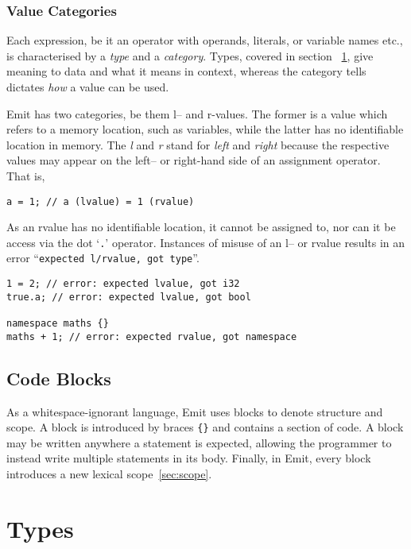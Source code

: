 \documentclass{article}
\begin{document}
    \subsubsection{Value Categories}

    Each expression, be it an operator with operands, literals, or variable names etc., is characterised by a \textit{type} and a \textit{category}.
    Types, covered in section ~\ref{sec:types}, give meaning to data and what it means in context, whereas the category tells dictates \textit{how} a value can be used.

    Emit has two categories, be them l-- and r-values.
    The former is a value which refers to a memory location, such as variables, while the latter has no identifiable location in memory.
    The \textit{l} and \textit{r} stand for \textit{left} and \textit{right} because the respective values may appear on the left-- or right-hand side of an assignment operator.
    That is,

    \begin{lstlisting}[language=CustomLang]
a = 1; // a (lvalue) = 1 (rvalue)
    \end{lstlisting}

    As an rvalue has no identifiable location, it cannot be assigned to, nor can it be access via the dot `\texttt{.}' operator.
    Instances of misuse of an l-- or rvalue results in an error ``\texttt{expected l/rvalue, got type}''.

    \begin{lstlisting}[language=CustomLang]
1 = 2; // error: expected lvalue, got i32
true.a; // error: expected lvalue, got bool

namespace maths {}
maths + 1; // error: expected rvalue, got namespace
    \end{lstlisting}

    \subsection{Code Blocks}\label{subsec:code-blocks}

    As a whitespace-ignorant language, Emit uses blocks to denote structure and scope.
    A block is introduced by braces \texttt{\{\}} and contains a section of code.
    A block may be written anywhere a statement is expected, allowing the programmer to instead write multiple statements in its body.
    Finally, in Emit, every block introduces a new lexical scope~\ref{sec:scope}.

    \section{Types}\label{sec:types}
\end{document}

